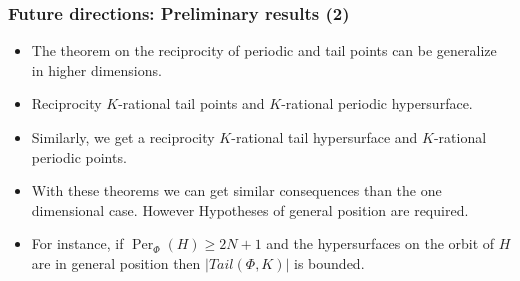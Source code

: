 \documentclass{beamer}
\DeclareMathOperator{\Per}{Per}
\theoremstyle{thmstyle}
\theoremstyle{mystyle}
\theoremstyle{qstnstyle}
\begin{document}
\begin{frame}
\frametitle{Future directions: Preliminary results (2)}

\begin{itemize}
\item The theorem on the reciprocity of periodic and tail points can be generalize in higher dimensions.
\pause

\item Reciprocity $K$-rational tail points and $K$-rational periodic hypersurface.

\pause

\item Similarly, we get a reciprocity $K$-rational tail hypersurface and $K$-rational periodic points.

\pause

\item With these theorems we can get similar consequences than the one dimensional case. However Hypotheses of general position are required. 

\pause

\item For instance, if $\Per_{\Phi}(H) \geq 2N+1$ and the hypersurfaces on the orbit of $H$ are in general position then $|Tail(\Phi,K)|$ is  bounded.
\end{itemize}


\end{frame}
\end{document}
